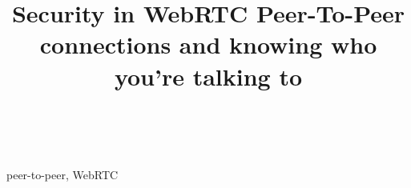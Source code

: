 \documentclass[conference]{IEEEtran}
\begin{document}
\title{Security in WebRTC Peer-To-Peer connections and knowing who you're talking to\\
}

\author{
 \\
\textit{}
}

\maketitle

\begin{abstract}
\end{abstract}

\begin{IEEEkeywords}
peer-to-peer, WebRTC
\end{IEEEkeywords}
\end{document}
